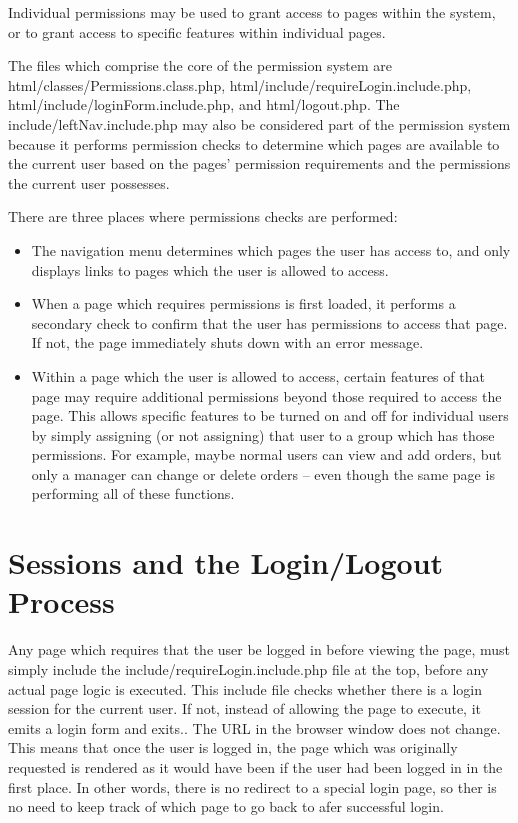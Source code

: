 \documentclass[letterpaper,10pt,english]{sphinxmanual}
\begin{document}
Individual permissions may be used to grant access to pages within the system, or to grant access to
specific features within individual pages.

The files which comprise the core of the permission system are html/classes/Permissions.class.php,
html/include/requireLogin.include.php, html/include/loginForm.include.php, and html/logout.php.  The
include/leftNav.include.php may also be considered part of the permission system because it performs
permission checks to determine which pages are available to the current user based on the pages'
permission requirements and the permissions the current user possesses.

There are three places where permissions checks are performed:
\begin{itemize}
\item {} 
The navigation menu determines which pages the user has access to, and only displays links to
pages which the user is allowed to access.

\item {} 
When a page which requires permissions is first loaded, it performs a secondary check to confirm
that the user has permissions to access that page.  If not, the page immediately shuts down with
an error message.

\item {} 
Within a page which the user is allowed to access, certain features of that page may require
additional permissions beyond those required to access the page.  This allows specific features to
be turned on and off for individual users by simply assigning (or not assigning) that user to a
group which has those permissions.  For example, maybe normal users can view and add orders, but
only a manager can change or delete orders -- even though the same page is performing all of these
functions.

\end{itemize}


\section{Sessions and the Login/Logout Process}
\label{jaxFrameworkGuide:sessions-and-the-login-logout-process}
Any page which requires that the user be logged in before viewing the page, must simply include the
include/requireLogin.include.php file at the top, before any actual page logic is executed.  This
include file checks whether there is a login session for the current user.  If not, instead of
allowing the page to execute, it emits a login form and exits..  The URL in the browser window does
not change.  This means that once the user is logged in, the page which was originally requested is
rendered as it would have been if the user had been logged in in the first place.  In other words,
there is no redirect to a special login page, so ther is no need to keep track of which page to go
back to afer successful login.
\end{document}
